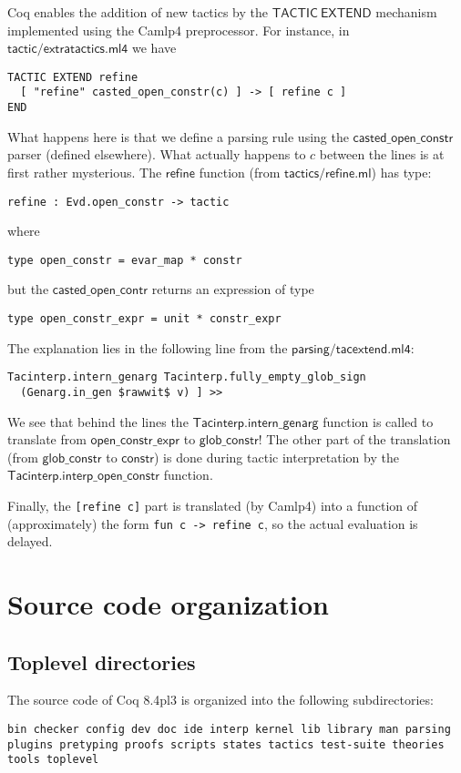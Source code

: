 \documentclass[a4paper,oneside]{book}
\newcommand{\m}[1]{\ensuremath{\mathsf{#1}}}
\begin{document}
Coq enables the addition of new tactics by the \m{TACTIC\ EXTEND}
mechanism implemented using the Camlp4 preprocessor. For instance, in
\m{tactic/extratactics.ml4} we have
\begin{lstlisting}
TACTIC EXTEND refine
  [ "refine" casted_open_constr(c) ] -> [ refine c ]
END
\end{lstlisting}
What happens here is that we define a parsing rule using the
\m{casted\_open\_constr} parser (defined elsewhere). What actually
happens to $c$ between the lines is at first rather mysterious. The
\m{refine} function (from \m{tactics/refine.ml}) has type:
\begin{lstlisting}
refine : Evd.open_constr -> tactic
\end{lstlisting}
where
\begin{lstlisting}
type open_constr = evar_map * constr
\end{lstlisting}

\noindent
but the \m{casted\_open\_contr} returns an expression of type

\begin{lstlisting}
type open_constr_expr = unit * constr_expr
\end{lstlisting}
The explanation lies in the following line from the
\m{parsing/tacextend.ml4}:

\begin{lstlisting}
Tacinterp.intern_genarg Tacinterp.fully_empty_glob_sign
  (Genarg.in_gen $rawwit$ v) ] >>
\end{lstlisting}
We see that behind the lines the \m{Tacinterp.intern\_genarg} function
is called to translate from \m{open\_constr\_expr} to
\m{glob\_constr}! The other part of the translation (from
\m{glob\_constr} to \m{constr}) is done during tactic interpretation
by the \m{Tacinterp.interp\_open\_constr} function.

Finally, the \verb|[refine c]| part is translated (by Camlp4) into a
function of (approximately) the form \verb|fun c -> refine c|, so the
actual evaluation is delayed.

\chapter{Source code organization}

\section{Toplevel directories}

The source code of Coq 8.4pl3 is organized into the following
subdirectories:
\begin{lstlisting}
bin checker config dev doc ide interp kernel lib library man parsing
plugins pretyping proofs scripts states tactics test-suite theories
tools toplevel
\end{lstlisting}
\end{document}
